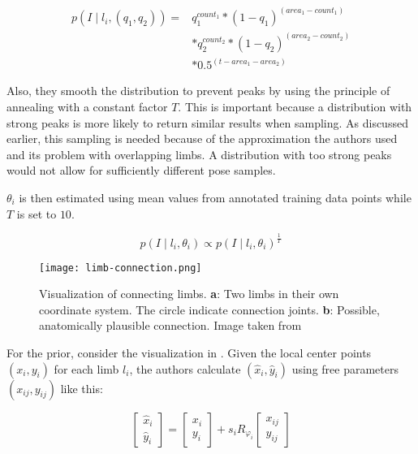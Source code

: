 \begin{equation}
    \begin{split}
        p(I \mid l_i, (q_1, q_2)) = &q_1^{count_1} * (1 - q_1)^{(area_1 - count_1)} \\ 
        &* q_2^{count_2} * (1 - q_2)^{(area_2 - count_2)} \\ 
        &* 0.5^{(t - area_1 - area_2)}
    \end{split}
\end{equation}

Also, they smooth the distribution to prevent peaks by using the principle of annealing with a constant factor $T$.
This is important because a distribution with strong peaks is more likely to return similar results when sampling.
As discussed earlier, this sampling is needed because of the approximation the authors used and its problem with overlapping limbs.  A distribution with too strong peaks would not allow for sufficiently different pose samples.

$\theta_i$ is then estimated using mean values from annotated training data points while $T$ is set to $10$.

\begin{equation}
    p(I \mid l_i, \theta_i) \propto p(I \mid l_i, \theta_i)^{\frac{1}{T}}
\end{equation}

\begin{figure}[htb!]
    \centering
    \texttt{[image: limb-connection.png]}
    \caption{Visualization of connecting limbs. \textbf{a}: Two limbs in their own coordinate system. The circle indicate connection joints. \textbf{b}: Possible, anatomically plausible connection. Image taken from \cite{felzenszwalb_pictorial_2005}}
    \label{fig:limb-connection}
\end{figure}

For the prior, consider the visualization in .
Given the local center points $(x_i, y_i)$ for each limb $l_i$, the authors calculate $(\hat{x}_i, \hat{y}_i)$ using free parameters $(x_{ij}, y_{ij})$ like this:

\begin{equation}
    \begin{bmatrix}
        \hat{x}_i \\ 
        \hat{y}_i
    \end{bmatrix}
    =
    \begin{bmatrix}
        x_i \\ 
        y_i
    \end{bmatrix}
    + s_i R_{\varphi_i}
    \begin{bmatrix}
        x_{ij} \\ 
        y_{ij}
    \end{bmatrix}    
\end{equation}

